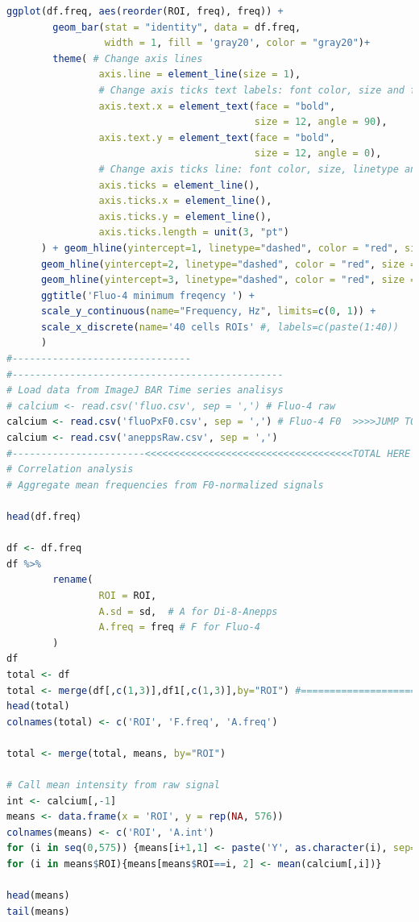 \documentclass{biophys-new}
\begin{document}
\begin{lstlisting}[language=R]
ggplot(df.freq, aes(reorder(ROI, freq), freq)) +
        geom_bar(stat = "identity", data = df.freq,
                 width = 1, fill = 'gray20', color = "gray20")+
        theme( # Change axis lines
                axis.line = element_line(size = 1),
                # Change axis ticks text labels: font color, size and face
                axis.text.x = element_text(face = "bold",
                                           size = 12, angle = 90),
                axis.text.y = element_text(face = "bold",
                                           size = 12, angle = 0),
                # Change axis ticks line: font color, size, linetype and length
                axis.ticks = element_line(),
                axis.ticks.x = element_line(),
                axis.ticks.y = element_line(),
                axis.ticks.length = unit(3, "pt")
      ) + geom_hline(yintercept=1, linetype="dashed", color = "red", size = 1) +
      geom_hline(yintercept=2, linetype="dashed", color = "red", size = 1) +
      geom_hline(yintercept=3, linetype="dashed", color = "red", size = 1) +
      ggtitle('Fluo-4 minimum freqency ') +
      scale_y_continuous(name="Frequency, Hz", limits=c(0, 1)) +
      scale_x_discrete(name='40 cells ROIs' #, labels=c(paste(1:40))
      )
#-------------------------------
#-----------------------------------------------
# Load data from ImageJ BAR Time series analisys
# calcium <- read.csv('fluo.csv', sep = ',') # Fluo-4 raw
calcium <- read.csv('fluoPxF0.csv', sep = ',') # Fluo-4 F0  >>>>JUMP TO total
calcium <- read.csv('aneppsRaw.csv', sep = ',')
#-----------------------<<<<<<<<<<<<<<<<<<<<<<<<<<<<<<<<<<<<TOTAL HERE
# Correlation analysis
# Aggregate mean frequencies from F0-normalized signals

head(df.freq)

df <- df.freq
df %>%
        rename(
                ROI = ROI,
                A.sd = sd,  # A for Di-8-Anepps
                A.freq = freq # F for Fluo-4
        )
df
total <- df
total <- merge(df[,c(1,3)],df1[,c(1,3)],by="ROI") #====================
head(total)
colnames(total) <- c('ROI', 'F.freq', 'A.freq')

total <- merge(total, means, by="ROI")

# Call mean intensity from raw signal
int <- calcium[,-1]
means <- data.frame(x = 'ROI', y = rep(NA, 576))
colnames(means) <- c('ROI', 'A.int')
for (i in seq(0,575)) {means[i+1,1] <- paste('Y', as.character(i), sep="")}
for (i in means$ROI){means[means$ROI==i, 2] <- mean(calcium[,i])}

head(means)
tail(means)


\end{lstlisting}
\end{document}
